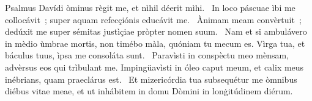 { Psalmus Davídi}
{%
òminus règit me, et nìhil déerit mìhi. 
~In loco páscuae ìbi me collocávit~; super aquam refecçiónis educávit me. 
~Ànimam meam convèrtuit~; dedúxit me super sémitas justìçiae pròpter nomen suum. 
~Nam et si ambulávero in mèdio ùmbrae mortis, non timébo màla, quóniam tu mecum es. Vìrga tua, et báculus tuus, ìpsa me consoláta sunt. 
~Paravìsti in conspèctu meo mènsam, advèrsus eos qui trìbulant me. Impingüavìsti in óleo caput meum, et calix meus inébrians, quam praeclárus est. 
~Et mizericórdia tua subsequétur me òmnibus diébus vitae meae, et ut inhábitem in domu Dòmini in lonġitúdinem diérum. 
}
